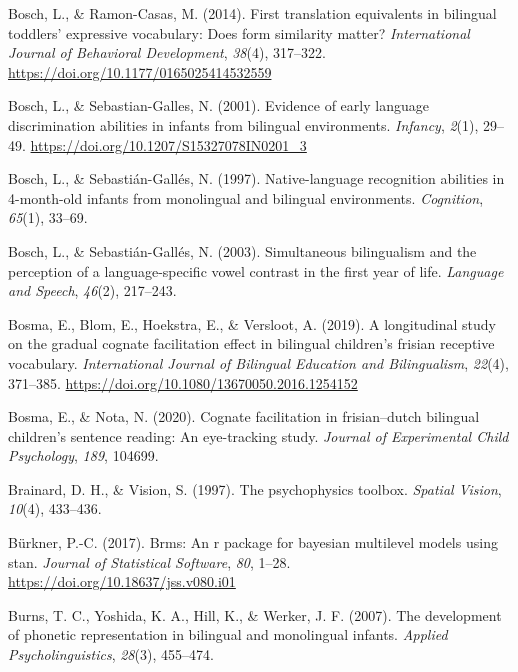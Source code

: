 \documentclass[
  12pt,
  b5paperpaper,
  twoside]{scrreprt}
\newlength{\cslhangindent}
\newlength{\cslentryspacingunit} %
\newenvironment{CSLReferences}[2] %
 {%
  \setlength{\parindent}{0pt}
  \ifodd #1
  \let\oldpar\par
  \def\par{\hangindent=\cslhangindent\oldpar}
  \fi
  \setlength{\parskip}{#2\cslentryspacingunit}
 }%
 {}
\begin{document}
\begin{CSLReferences}{1}{0}
\leavevmode{}%
Bosch, L., \& Ramon-Casas, M. (2014). First translation equivalents in
bilingual toddlers' expressive vocabulary: Does form similarity matter?
\emph{International Journal of Behavioral Development}, \emph{38}(4),
317--322. \url{https://doi.org/10.1177/0165025414532559}

\leavevmode{}%
Bosch, L., \& Sebastian-Galles, N. (2001). Evidence of early language
discrimination abilities in infants from bilingual environments.
\emph{Infancy}, \emph{2}(1), 29--49.
\url{https://doi.org/10.1207/S15327078IN0201_3}

\leavevmode{}%
Bosch, L., \& Sebastián-Gallés, N. (1997). Native-language recognition
abilities in 4-month-old infants from monolingual and bilingual
environments. \emph{Cognition}, \emph{65}(1), 33--69.

\leavevmode{}%
Bosch, L., \& Sebastián-Gallés, N. (2003). Simultaneous bilingualism and
the perception of a language-specific vowel contrast in the first year
of life. \emph{Language and Speech}, \emph{46}(2), 217--243.

\leavevmode{}%
Bosma, E., Blom, E., Hoekstra, E., \& Versloot, A. (2019). A
longitudinal study on the gradual cognate facilitation effect in
bilingual children's frisian receptive vocabulary. \emph{International
Journal of Bilingual Education and Bilingualism}, \emph{22}(4),
371--385. \url{https://doi.org/10.1080/13670050.2016.1254152}

\leavevmode{}%
Bosma, E., \& Nota, N. (2020). Cognate facilitation in frisian--dutch
bilingual children's sentence reading: An eye-tracking study.
\emph{Journal of Experimental Child Psychology}, \emph{189}, 104699.

\leavevmode{}%
Brainard, D. H., \& Vision, S. (1997). The psychophysics toolbox.
\emph{Spatial Vision}, \emph{10}(4), 433--436.

\leavevmode{}%
Bürkner, P.-C. (2017). Brms: An r package for bayesian multilevel models
using stan. \emph{Journal of Statistical Software}, \emph{80}, 1--28.
\url{https://doi.org/10.18637/jss.v080.i01}

\leavevmode{}%
Burns, T. C., Yoshida, K. A., Hill, K., \& Werker, J. F. (2007). The
development of phonetic representation in bilingual and monolingual
infants. \emph{Applied Psycholinguistics}, \emph{28}(3), 455--474.


\end{CSLReferences}
\end{document}
